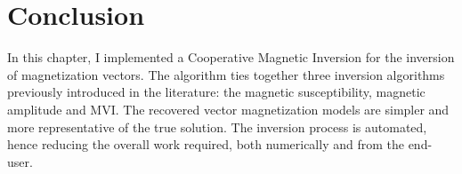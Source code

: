  \section{Conclusion}   
In this chapter, I implemented a Cooperative Magnetic Inversion for the inversion of magnetization vectors.
The algorithm ties together three inversion algorithms previously introduced in the literature: the magnetic susceptibility, magnetic amplitude and MVI.
The recovered vector magnetization models are simpler and more representative of the true solution. 
The inversion process is automated, hence reducing the overall work required, both numerically and from the end-user. 
    


\endinput

